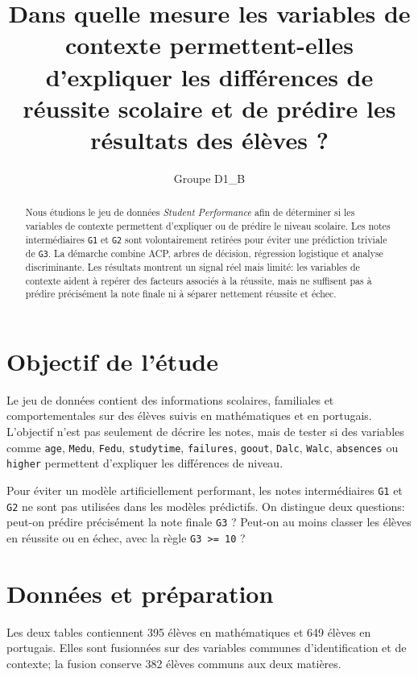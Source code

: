 \documentclass[twocolumn,10pt]{article}
\title{Dans quelle mesure les variables de contexte permettent-elles d'expliquer les différences de réussite scolaire et de prédire les résultats des élèves ?}
\author{Groupe D1\_B}
\date{}
\begin{document}
\maketitle
\vspace{-0.4em}

\begin{abstract}
Nous étudions le jeu de données \emph{Student Performance} afin de déterminer si les variables de contexte permettent d'expliquer ou de prédire le niveau scolaire. Les notes intermédiaires \texttt{G1} et \texttt{G2} sont volontairement retirées pour éviter une prédiction triviale de \texttt{G3}. La démarche combine ACP, arbres de décision, régression logistique et analyse discriminante. Les résultats montrent un signal réel mais limité: les variables de contexte aident à repérer des facteurs associés à la réussite, mais ne suffisent pas à prédire précisément la note finale ni à séparer nettement réussite et échec.
\end{abstract}

\section{Objectif de l'étude}

Le jeu de données contient des informations scolaires, familiales et comportementales sur des élèves suivis en mathématiques et en portugais. L'objectif n'est pas seulement de décrire les notes, mais de tester si des variables comme \texttt{age}, \texttt{Medu}, \texttt{Fedu}, \texttt{studytime}, \texttt{failures}, \texttt{goout}, \texttt{Dalc}, \texttt{Walc}, \texttt{absences} ou \texttt{higher} permettent d'expliquer les différences de niveau.

Pour éviter un modèle artificiellement performant, les notes intermédiaires \texttt{G1} et \texttt{G2} ne sont pas utilisées dans les modèles prédictifs. On distingue deux questions: peut-on prédire précisément la note finale \texttt{G3} ? Peut-on au moins classer les élèves en réussite ou en échec, avec la règle \texttt{G3 >= 10} ?

\section{Données et préparation}

Les deux tables contiennent 395 élèves en mathématiques et 649 élèves en portugais. Elles sont fusionnées sur des variables communes d'identification et de contexte; la fusion conserve 382 élèves communs aux deux matières.
\end{document}
